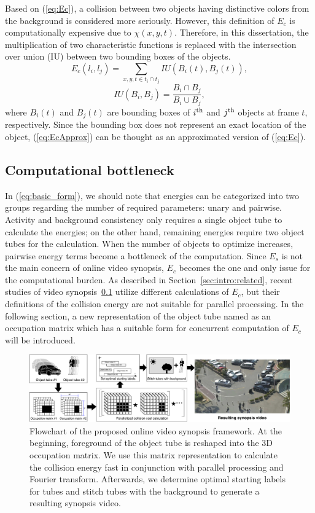 \documentclass[11pt]{hyu_thesis}
\begin{document}
Based on (\ref{eq:Ec}), a collision between two objects having distinctive colors from the background is considered more seriously. However, this definition of $E_c$ is computationally expensive due to $\chi(x,y,t)$. Therefore, in this dissertation, the multiplication of two characteristic functions is replaced with the intersection over union (IU) between two bounding boxes of the objects.
\begin{equation}
\label{eq:EcApprox}
E_c(l_i,l_j)=\sum_{x,y,t \in t_i \cap t_j} IU \left( B_i(t),B_j(t) \right),
\end{equation}
\begin{equation}
IU(B_i,B_j)=\frac{B_i \cap B_j}{B_i \cup B_j},
\end{equation}
where $B_i(t)$ and $B_j(t)$ are bounding boxes of $i^{\rm{th}}$ and $j^{\rm{th}}$ objects at frame $t$, respectively. Since the bounding box does not represent an exact location of the object, (\ref{eq:EcApprox}) can be thought as an approximated version of (\ref{eq:Ec}).

\subsection{Computational bottleneck}
In (\ref{eq:basic_form}), we should note that energies can be categorized into two groups regarding the number of required parameters: unary and pairwise. Activity and background consistency only requires a single object tube to calculate the energies; on the other hand, remaining energies require two object tubes for the calculation. When the number of objects to optimize increases, pairwise energy terms become a bottleneck of the computation. Since $E_s$ is not the main concern of online video synopsis, $E_c$ becomes the one and only issue for the computational burden. As described in Section~\ref{sec:intro:related}, recent studies of video synopsis~\ref{} utilize different calculations of $E_c$, but their definitions of the collision energy are not suitable for parallel processing. In the following section, a new representation of the object tube named as an occupation matrix which has a suitable form for concurrent computation of $E_c$ will be introduced.

\begin{figure}
\includegraphics[width=\linewidth]{flowchart.pdf}
\caption{Flowchart of the proposed online video synopsis framework. At the beginning, foreground of the object tube is reshaped into the 3D occupation matrix. We use this matrix representation to calculate the collision energy fast in conjunction with parallel processing and Fourier transform. Afterwards, we determine optimal starting labels for tubes and stitch tubes with the background to generate a resulting synopsis video.}
\label{fig:flowchart}
\end{figure}
\end{document}
